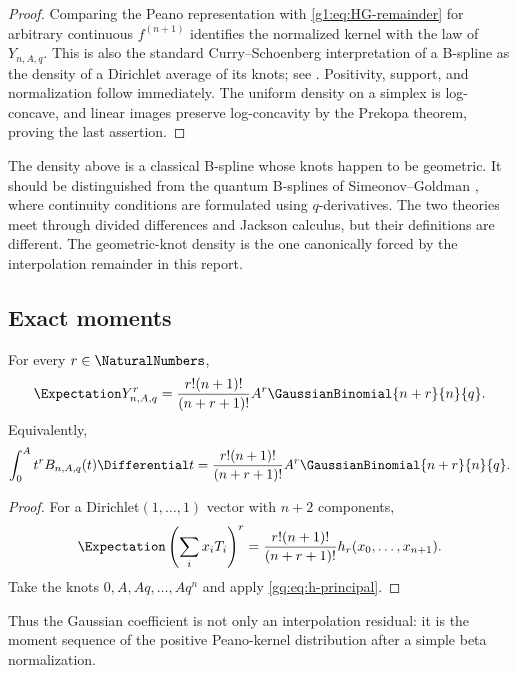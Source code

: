 \begin{proof}
Comparing the Peano representation with \eqref{g1:eq:HG-remainder} for arbitrary
continuous $f^{(n+1)}$ identifies the normalized kernel with the law of
$Y_{n,A,q}$.  This is also the standard Curry--Schoenberg interpretation of a
B-spline as the density of a Dirichlet average of its knots; see
\cite{deBoor}.  Positivity, support, and normalization follow immediately.
The uniform density on a simplex is log-concave, and linear images preserve
log-concavity by the Prekopa theorem, proving the last assertion.
\end{proof}

\begin{remark}
The density above is a classical B-spline whose knots happen to be geometric.
It should be distinguished from the quantum B-splines of
Simeonov--Goldman \cite{SimeonovGoldman}, where continuity conditions are
formulated using $q$-derivatives.  The two theories meet through divided
differences and Jackson calculus, but their definitions are different.  The
geometric-knot density is the one canonically forced by the interpolation
remainder in this report.
\end{remark}

\subsection{Exact moments}

\begin{theorem}
For every $r\in\NaturalNumbers$,
\begin{equation}
 \Expectation Y_{n,A,q}^r
 =\frac{r!(n+1)!}{(n+r+1)!}
 A^r\GaussianBinomial{n+r}{n}{q}.
 \label{g1:eq:Y-moments}
\end{equation}
Equivalently,
\begin{equation}
 \int_0^At^rB_{n,A,q}(t)\Differential t
 =\frac{r!(n+1)!}{(n+r+1)!}
 A^r\GaussianBinomial{n+r}{n}{q}.
\end{equation}
\end{theorem}

\begin{proof}
For a Dirichlet$(1,\ldots,1)$ vector with $n+2$ components,
\[
 \Expectation\left(\sum_i x_iT_i\right)^r
 =\frac{r!(n+1)!}{(n+r+1)!}h_r(x_0,\ldots,x_{n+1}).
\]
Take the knots $0,A,Aq,\ldots,Aq^n$ and apply
\eqref{gq:eq:h-principal}.
\end{proof}

Thus the Gaussian coefficient is not only an interpolation residual: it is the
moment sequence of the positive Peano-kernel distribution after a simple beta
normalization.

